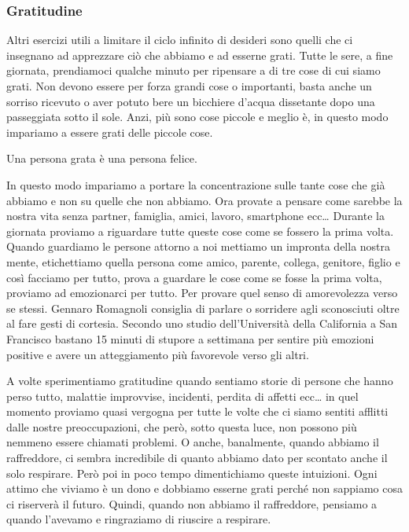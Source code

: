 \documentclass[12pt]{book} %
\begin{document}
\subsubsection{Gratitudine}
Altri esercizi utili a limitare il ciclo infinito
di desideri sono quelli che ci insegnano ad apprezzare ciò che abbiamo e ad esserne grati. Tutte le sere, a fine
giornata, prendiamoci qualche minuto per ripensare a di tre cose di cui siamo grati.
Non devono essere per forza grandi cose o importanti, basta anche un sorriso ricevuto o aver potuto bere un bicchiere
d'acqua dissetante dopo una passeggiata sotto il sole. Anzi, più
sono cose piccole e meglio è, in questo modo impariamo a essere grati delle piccole cose. 

Una persona grata è una persona felice. 

In questo modo impariamo a portare la concentrazione sulle tante cose che già abbiamo e non su quelle che non abbiamo.
Ora provate a pensare come sarebbe la nostra vita senza partner, famiglia, amici, lavoro, smartphone ecc… Durante la
giornata proviamo a riguardare tutte queste cose come se fossero la prima volta. Quando guardiamo le persone attorno a
noi mettiamo un impronta della nostra mente, etichettiamo quella persona come amico, parente, collega, genitore, figlio
e così facciamo per tutto, prova a guardare le cose come se fosse la prima volta, proviamo ad emozionarci per tutto.
Per provare quel senso di amorevolezza verso se stessi. Gennaro Romagnoli consiglia di parlare o sorridere agli
sconosciuti oltre al fare gesti di cortesia. Secondo uno studio dell'Università della California a San Francisco
bastano 15 minuti di stupore a settimana per sentire più emozioni positive e avere un
atteggiamento più favorevole verso gli altri.

A volte sperimentiamo gratitudine quando sentiamo storie di persone che hanno perso tutto, malattie improvvise, incidenti,
perdita di affetti ecc… in quel momento proviamo quasi vergogna per tutte le volte che ci siamo sentiti afflitti dalle
nostre preoccupazioni, che però, sotto questa luce, non possono più nemmeno essere chiamati problemi. O anche,
banalmente, quando abbiamo il raffreddore, ci sembra incredibile di quanto abbiamo dato per scontato anche il solo
respirare. Però poi in poco tempo dimentichiamo queste intuizioni. Ogni attimo che viviamo è un dono e dobbiamo
esserne grati perché non sappiamo cosa ci riserverà il futuro. Quindi, quando non abbiamo il raffreddore, pensiamo a quando l'avevamo e ringraziamo di riuscire a respirare.
\end{document}
